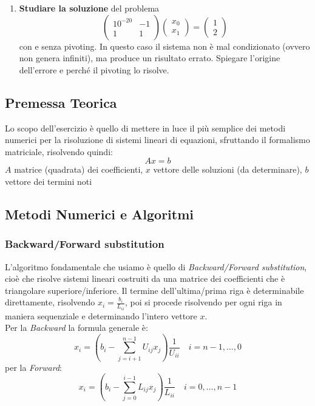 \documentclass[11pt, a4paper]{article}
\begin{document}
\begin{enumerate}
    \item \textbf{Studiare la soluzione} del problema
    \[
        \begin{pmatrix} 10^{-20} & -1 \\ 1 & 1 \end{pmatrix} \begin{pmatrix} x_0 \\ x_1 \end{pmatrix} = \begin{pmatrix} 1 \\ 2 \end{pmatrix}
    \]
    con e senza pivoting. In questo caso il sistema non è mal condizionato (ovvero non genera infiniti), ma produce un risultato errato. Spiegare l'origine dell'errore e perché il pivoting lo risolve.
\end{enumerate}

\subsection{Premessa Teorica}
Lo scopo dell'esercizio è quello di mettere in luce il più semplice dei metodi numerici per la risoluzione di sistemi lineari di equazioni, sfruttando il formalismo matriciale, risolvendo quindi:
$$
Ax=b
$$
$A$ matrice (quadrata) dei coefficienti, $x$ vettore delle soluzioni (da determinare), $b$ vettore dei termini noti
\subsection{Metodi Numerici e Algoritmi}
\subsubsection{Backward/Forward substitution} \label{sec: Back-Forw Subst}
L'algoritmo fondamentale che usiamo è quello di \textit{Backward/Forward substitution}, cioè che risolve sistemi lineari costruiti da una matrice dei coefficienti che è triangolare superiore/inferiore. Il termine dell'ultima/prima riga è determinabile direttamente, risolvendo $x_i = \frac{b_i}{L_{ii}}$, poi si procede risolvendo per ogni riga in maniera sequenziale e determinando l'intero vettore $x$.\\Per la \textit{Backward} la formula generale è:
$$
x_i = \left( b_i - \sum_{j=i+1}^{n-1} U_{ij}x_j \right) \frac{1}{U_{ii}} \quad i = n-1, \dots , 0
$$
per la \textit{Forward}:
$$
x_i = \left( b_i - \sum_{j=0}^{i-1} L_{ij}x_j \right) \frac{1}{L_{ii}} \quad i = 0, \dots, n-1
$$
\end{document}
